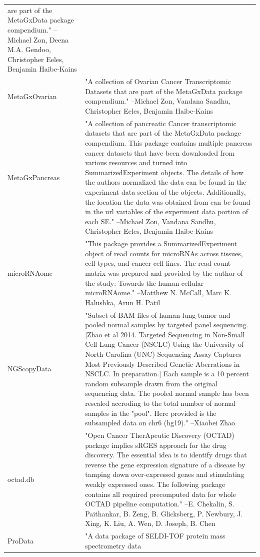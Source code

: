 \documentclass[]{article}
\begin{document}
\begin{longtable}[t]{l>{\raggedright\arraybackslash}p{25em}}
are part of the MetaGxData package compendium." --Michael Zon, Deena M.A. Gendoo, Christopher Eeles, Benjamin Haibe-Kains\\
MetaGxOvarian & "A collection of Ovarian Cancer Transcriptomic Datasets
that are part of the MetaGxData package compendium." --Michael Zon, Vandana Sandhu, Christopher Eeles, Benjamin Haibe-Kains\\
\addlinespace
MetaGxPancreas & "A collection of pancreatic Cancer transcriptomic datasets
that are part of the MetaGxData package compendium. This
package contains multiple pancreas cancer datasets that have
been downloaded from various resources and turned into
SummarizedExperiment objects. The details of how the authors
normalized the data can be found in the experiment data section
of the objects. Additionally, the location the data was
obtained from can be found in the url variables of the
experiment data portion of each SE." --Michael Zon, Vandana Sandhu, Christopher Eeles, Benjamin Haibe-Kains\\
microRNAome & "This package provides a SummarizedExperiment object of
read counts for microRNAs across tissues, cell-types, and
cancer cell-lines. The read count matrix was prepared and
provided by the author of the study: Towards the human cellular
microRNAome." --Matthew N. McCall, Marc K. Halushka, Arun H. Patil\\
NGScopyData & "Subset of BAM files of human lung tumor and pooled normal
samples by targeted panel sequencing. [Zhao et al 2014.
Targeted Sequencing in Non-Small Cell Lung Cancer (NSCLC) Using
the University of North Carolina (UNC) Sequencing Assay
Captures Most Previously Described Genetic Aberrations in
NSCLC. In preparation.] Each sample is a 10 percent random
subsample drawn from the original sequencing data. The pooled
normal sample has been rescaled accroding to the total number
of normal samples in the "pool". Here provided is the
subsampled data on chr6 (hg19)." --Xiaobei Zhao\\
octad.db & "Open Cancer TherApeutic Discovery (OCTAD) package implies
sRGES approach for the drug discovery. The essential idea is to
identify drugs that reverse the gene expression signature of a
disease by tamping down over-expressed genes and stimulating
weakly expressed ones. The following package contains all
required precomputed data for whole OCTAD pipeline computation." --E. Chekalin, S. Paithankar, B. Zeng, B. Glicksberg, P. Newbury, J. Xing, K. Liu, A. Wen, D. Joseph, B. Chen\\
ProData & "A data package of SELDI-TOF protein mass spectrometry data

\end{longtable}
\end{document}
